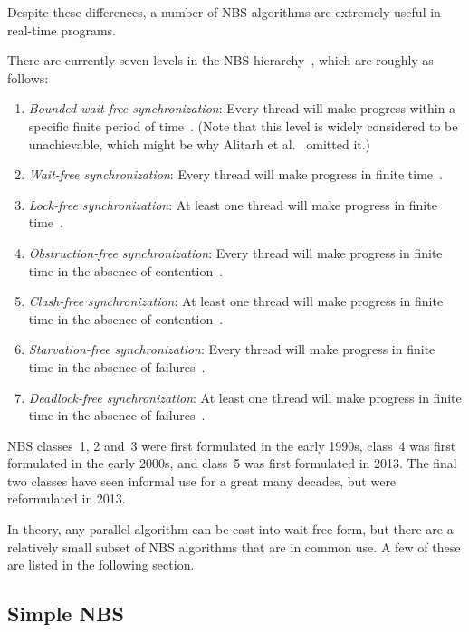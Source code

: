Despite these differences, a number of NBS algorithms are extremely
useful in real-time programs.

There are currently seven levels in the NBS
hierarchy~\cite{DanAlitarh2013PracticalProgress}, which are roughly
as follows:

\begin{enumerate}
\item	\emph{Bounded wait-free synchronization}: Every thread
	will make progress within
	a specific finite period of time~\cite{Herlihy91}.
	(Note that this level is 
	widely considered to be unachievable, which might be why
	Alitarh et al.~\cite{DanAlitarh2013PracticalProgress}
	omitted it.)
\item	\emph{Wait-free synchronization}: Every thread will make progress
	in finite time~\cite{Herlihy93}.
\item	\emph{Lock-free synchronization}: At least one thread will
	make progress in finite time~\cite{Herlihy93}.
\item	\emph{Obstruction-free synchronization}: Every thread will
	make progress in finite time in the absence of
	contention~\cite{HerlihyLM03}.
\item	\emph{Clash-free synchronization}: At least one thread will
	make progress in finite time in the absence of
	contention~\cite{DanAlitarh2013PracticalProgress}.
\item	\emph{Starvation-free synchronization}: Every thread will
	make progress in finite time in the absence of
	failures~\cite{DanAlitarh2013PracticalProgress}.
\item	\emph{Deadlock-free synchronization}: At least one thread will
	make progress in finite time in the absence of
	failures~\cite{DanAlitarh2013PracticalProgress}.
\end{enumerate}

NBS classes~1, 2 and~3 were first formulated in the early 1990s,
class~4 was first formulated in the early 2000s,
and class~5 was first formulated in 2013.
The final two classes have seen informal use for a great many decades,
but were reformulated in 2013.

In theory, any parallel algorithm can be cast into wait-free form,
but there are a relatively small subset of NBS algorithms that are
in common use.
A few of these are listed in the following section.

\subsection{Simple NBS}
\label{sec:advsync:Simple NBS}

